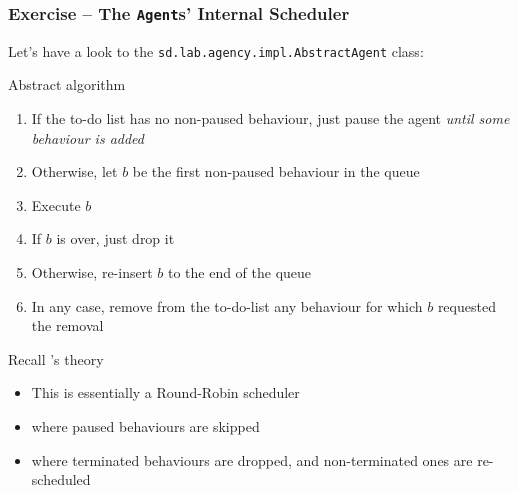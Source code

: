 \documentclass[presentation]{beamer}\mode<presentation>{\usetheme{AMSCesenaPurpleAndGold}}
\begin{document}
\begin{frame}[c, allowframebreaks]
    \frametitle{Exercise \currentExercise{} -- The \texttt{Agent}s' Internal Scheduler}

    Let's have a look to the \texttt{{\small{}sd.\allowbreak{}lab.\allowbreak{}agency.\allowbreak{}impl.\allowbreak{}}\alert{AbstractAgent}} class:
    

    \begin{exampleblock}{Abstract algorithm}
        \begin{enumerate}
            \item If the to-do list has no \alert{non-paused} behaviour, just pause the agent \emph{until some behaviour is added}

            \medskip

            \item Otherwise, let $b$ be the first non-paused behaviour in the queue

            \medskip

            \item Execute $b$

            \medskip

            \item If $b$ is over, just drop it

            \medskip

            \item Otherwise, re-insert $b$ to the end of the queue

            \medskip

            \item In any case, remove from the to-do-list any behaviour for which $b$ requested the removal
        \end{enumerate}
    \end{exampleblock}

    \begin{block}{Recall \jade{}'s theory}
        \begin{itemize}
            \item This is essentially a \alert{Round-Robin} scheduler

            \medskip

            \item where \alert{paused} behaviours are skipped

            \medskip

            \item where \alert{terminated} behaviours are dropped, and non-terminated ones are \alert{re-scheduled}
        \end{itemize}
    \end{block}


\end{frame}
\end{document}

